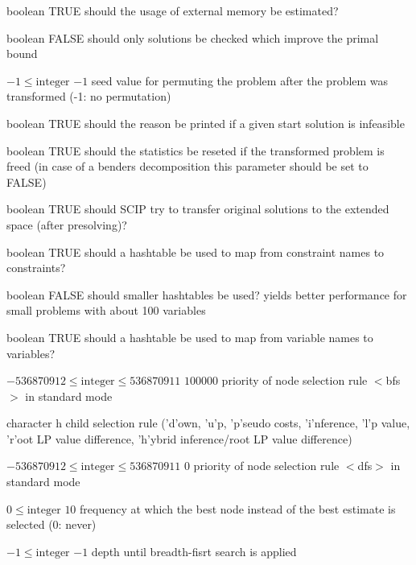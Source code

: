 %
{boolean}%
{TRUE}%
{should the usage of external memory be estimated?}%
{}

%
{boolean}%
{FALSE}%
{should only solutions be checked which improve the primal bound}%
{}

%
{$-1\leq\textrm{integer}$}%
{$-1$}%
{seed value for permuting the problem after the problem was transformed (-1: no permutation)}%
{}

%
{boolean}%
{TRUE}%
{should the reason be printed if a given start solution is infeasible}%
{}

%
{boolean}%
{TRUE}%
{should the statistics be reseted if the transformed problem is freed (in case of a benders decomposition this parameter should be set to FALSE)}%
{}

%
{boolean}%
{TRUE}%
{should SCIP try to transfer original solutions to the extended space (after presolving)?}%
{}

%
{boolean}%
{TRUE}%
{should a hashtable be used to map from constraint names to constraints?}%
{}

%
{boolean}%
{FALSE}%
{should smaller hashtables be used? yields better performance for small problems with about 100 variables}%
{}

%
{boolean}%
{TRUE}%
{should a hashtable be used to map from variable names to variables?}%
{}

%
{$-536870912\leq\textrm{integer}\leq536870911$}%
{$100000$}%
{priority of node selection rule $<$bfs$>$ in standard mode}%
{}

%
{character}%
{h}%
{child selection rule ('d'own, 'u'p, 'p'seudo costs, 'i'nference, 'l'p value, 'r'oot LP value difference, 'h'ybrid inference/root LP value difference)}%
{}

%
{$-536870912\leq\textrm{integer}\leq536870911$}%
{$0$}%
{priority of node selection rule $<$dfs$>$ in standard mode}%
{}

%
{$0\leq\textrm{integer}$}%
{$10$}%
{frequency at which the best node instead of the best estimate is selected (0: never)}%
{}

%
{$-1\leq\textrm{integer}$}%
{$-1$}%
{depth until breadth-fisrt search is applied}%
{}

